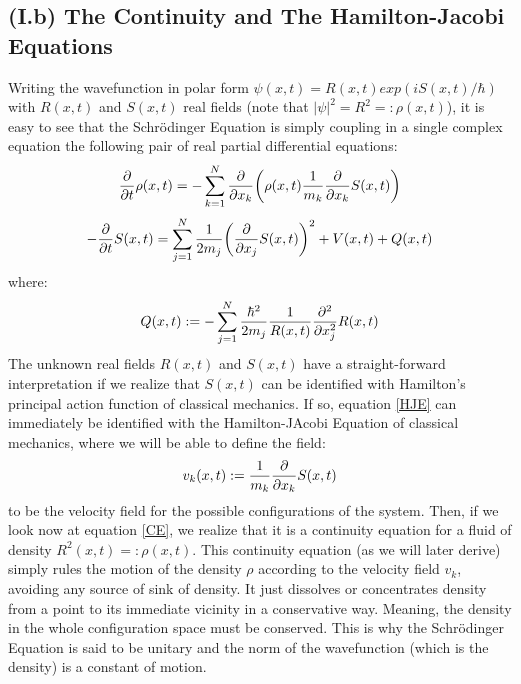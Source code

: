 \documentclass[11pt, a4paper]{article} %
\begin{document}
\subsection*{(I.b) The Continuity and The Hamilton-Jacobi Equations}
Writing the wavefunction in polar form $\psi(x,t)=R(x,t)exp(iS(x,t)/\hbar)$ with $R(x,t)$ and $S(x,t)$ real fields (note that $|\psi|^2=R^2=:\rho(x,t)$), it is easy to see that the Schrödinger Equation is simply coupling in a single complex equation the following pair of real partial differential equations:
\begin{equation}\label{CE}
\pdv{}{t} \rho(x,t)=-\sum_{k=1}^N \pdv{}{x_k}\qty( \rho(x,t)\frac{1}{m_k}\pdv{}{x_k} S(x,t) )
\end{equation}
\begin{equation}\label{HJE}
-\pdv{}{t}S(x,t) = \sum_{j=1}^N \frac{1}{2m_j} \qty(\pdv{}{x_j} S(x,t) )^2+ V(x,t)+Q(x,t)
\end{equation}
where:
\begin{equation}\label{QP}
Q(x,t):=-\sum_{j=1}^N \frac{\hbar^2}{2m_j}\frac{1}{R(x,t)}\pdv[2]{}{x_j} R(x,t)
\end{equation}
The unknown real fields $R(x,t)$ and $S(x,t)$ have a straight-forward interpretation if we realize that $S(x,t)$ can be identified with Hamilton's principal action function of classical mechanics. If so, equation \eqref{HJE} can immediately be identified with the Hamilton-JAcobi Equation of classical mechanics, where we will be able to define the field:%
\begin{equation}
v_k(x,t):=\frac{1}{m_k}\pdv{}{x_k}S(x,t)
\end{equation}
to be the velocity field for the possible configurations of the system. Then, if we look now at equation \eqref{CE}, we realize that it is a continuity equation for a fluid of density $R^2(x,t)=:\rho(x,t)$. This continuity equation (as we will later derive) simply rules the motion of the density $\rho$ according to the velocity field $v_k$, avoiding any source of sink of density. It just dissolves or concentrates density from a point to its immediate vicinity in a conservative way. Meaning, the density in the whole configuration space must be conserved. This is why the Schrödinger Equation is said to be unitary and the norm of the wavefunction (which is the density) is a constant of motion.
\end{document}
